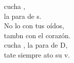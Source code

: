 \begin{cancion}[Escucha tú][Xaquín]%
	cucha ,\\
	la para de s.\\
	No lo con tus oídos,\\
	tambn con el corazón.\\
	cucha , la para de D,\\
	tate siempre ato su v.\\
\end{cancion}%
